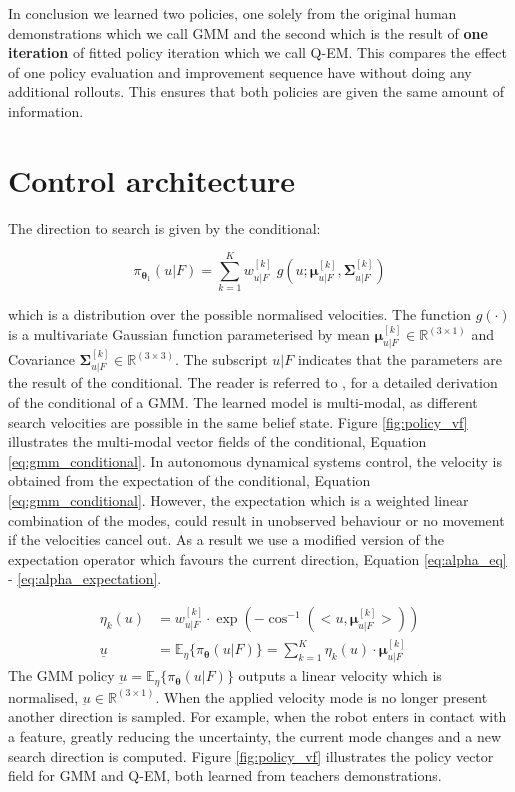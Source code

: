 \documentclass[final,5p,times,twocolumn]{elsarticle}
\newcommand{\SigK}{\boldsymbol{\Sigma}^{[k]}}
\newcommand{\MuK}{\boldsymbol{\mu}^{[k]}}
\newcommand{\xb}{u|F}
\newcommand{\Param}{\boldsymbol{\theta}}
\begin{document}
In conclusion we learned two policies, one solely from the original human demonstrations which we call GMM and the second which 
is the result of \textbf{one iteration} of fitted policy iteration which we call Q-EM. This compares the effect
of one policy evaluation and improvement sequence have without doing any additional rollouts. This ensures that both policies
are given the same amount of information.

\section{Control architecture}\label{sec:control_architecture}

The direction to search is given by the conditional:

\begin{equation}\label{eq:gmm_conditional}
 \pi_{\Param_1}(u\lvert F) = \sum_{k=1}^{K} w^{[k]}_{\xb} \; g(u;\MuK_{\xb},\SigK_{\xb}) 
 \end{equation}

which is a distribution over the possible normalised velocities. The function $g(\cdot)$ is a multivariate
Gaussian function parameterised by mean $\MuK_{\xb} \in \mathbb{R}^{(3\times1)}$ and Covariance 
${\SigK_{\xb} \in \mathbb{R}^{(3\times3)}}$. The subscript $\xb$ indicates that the parameters 
are the result of the conditional. The reader is referred to \cite{gesture_calinon_2010}, \cite{gmr_2004} for 
a detailed derivation of the conditional of a GMM. The learned model 
is multi-modal, as different search velocities are possible 
in the same belief state. Figure \ref{fig:policy_vf} illustrates the multi-modal 
vector fields of the conditional, Equation \ref{eq:gmm_conditional}.
In autonomous dynamical systems control, the velocity is obtained from 
the expectation of the conditional, Equation \ref{eq:gmm_conditional}. However, the expectation which is a weighted 
linear combination of the modes, could result in unobserved behaviour or no movement if the velocities cancel out. 
As a result we use a modified version of the expectation operator which favours the current
direction, Equation \ref{eq:alpha_eq} - \ref{eq:alpha_expectation}.

\begin{align}
 \eta_k(u) &= w^{[k]}_{\xb} \cdot \exp(-\cos^{-1}(<u,\MuK_{\xb}>)) \label{eq:alpha_eq}\\
 \underline{u} &= \mathbb{E}_{\eta}\{\pi_{\Param}(\xb)\} = \sum_{k=1}^K \eta_k(u) \cdot \MuK_{\xb} \label{eq:alpha_expectation}
\end{align}
The GMM policy $\underbar{u} = \mathbb{E}_{\eta}\{\pi_{\Param}(u \lvert F)\}$ outputs a linear velocity which 
is normalised, $\underbar{u} \in \mathbb{R}^{(3 \times 1)}$. When the applied velocity mode is no longer present another direction is sampled. 
For example, when the robot enters in contact with a feature, greatly reducing the uncertainty, the current mode changes and a new search direction is computed. 
Figure \ref{fig:policy_vf} illustrates the policy vector field for GMM and Q-EM, both learned from teachers demonstrations.
\end{document}
